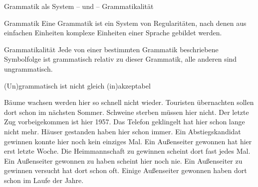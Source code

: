 \begin{frame}
  {Grammatik als System -- und  -- Grammatikalität}
  \onslide<+->
  \onslide<+->
  \Large\begin{block}{Grammatik}
    Eine Grammatik ist ein \alert{System von Regularitäten}, nach denen aus einfachen Einheiten komplexe Einheiten einer Sprache gebildet werden.
  \end{block}
  \Zeile

  \onslide<+->

  \begin{block}{Grammatikalität}
    Jede von einer bestimmten Grammatik beschriebene Symbolfolge ist \alert{grammatisch} relativ zu dieser Grammatik, alle anderen sind \alert{ungrammatisch}.
  \end{block}
\end{frame}

\begin{frame}
  {(Un)grammatisch ist nicht gleich (in)akzeptabel}
  \onslide<+->
  \onslide<+->
  \begin{exe}
    \ex\begin{xlist}
      \ex Bäume wachsen werden hier so schnell nicht wieder.
      \onslide<+->
      \ex Touristen übernachten sollen dort schon im nächsten Sommer.
      \onslide<+->
      \ex Schweine sterben müssen hier nicht.
      \onslide<+->
      \ex Der letzte Zug vorbeigekommen ist hier 1957.
      \onslide<+->
      \ex Das Telefon geklingelt hat hier schon lange nicht mehr.
      \onslide<+->
      \ex Häuser gestanden haben hier schon immer.
      \onslide<+->
      \ex Ein Abstiegskandidat gewinnen konnte hier noch kein einziges Mal.
      \onslide<+->
      \ex Ein Außenseiter gewonnen hat hier erst letzte Woche.
      \onslide<+->
      \ex Die Heimmannschaft zu gewinnen scheint dort fast jedes Mal.
      \onslide<+->
      \ex Ein Außenseiter gewonnen zu haben scheint hier noch nie.
      \onslide<+->
      \ex Ein Außenseiter zu gewinnen versucht hat dort schon oft.
      \onslide<+->
      \ex Einige Außenseiter gewonnen haben dort schon im Laufe der Jahre.
    \end{xlist}
  \end{exe}
\end{frame}

